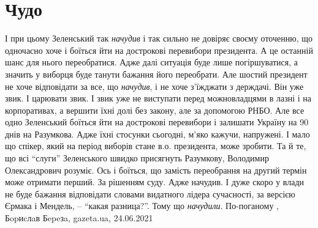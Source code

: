  
 
 
 
 
\chapter{Чудо}
\label{sec:slova.chudo}

І при цьому Зеленський так \emph{начудив} і так сильно не довіряє своєму оточенню, що
одночасно хоче і боїться йти на дострокові перевибори президента. А це останній
шанс для нього переобратися. Адже далі ситуація буде лише погіршуватися, а
значить у виборця буде танути бажання його переобрати. Але шостий президент не
хоче відповідати за все, що \emph{начудив}, і не хоче з'їжджати з держдачі. Він уже
звик. І царювати звик. І звик уже не виступати перед можновладцями в лазні і на
корпоративах, а вершити їхні долі без закону, але за допомогою РНБО. Але все
одно Зеленський боїться йти на дострокові перевибори і залишати Україну на 90
днів на Разумкова. Адже їхні стосунки сьогодні, м'яко кажучи, напружені. І мало
що спікер, який на період виборів стане в.о. президента, може зробити. Та й те,
що всі \enquote{слуги} Зеленського швидко присягнуть Разумкову, Володимир Олександрович
розуміє. Ось і боїться, що замість переобрання на другий термін може отримати
перший. За рішенням суду. Адже начудив.  І дуже скоро у влади не буде бажання
відповідати словами видатного лідера сучасності, за версією Єрмака і Мендель, –
\enquote{какая разница?}. Тому що \emph{начудили}. По-поганому
, 
Бopиcлaв Бepeзa, gazeta.ua, 24.06.2021

